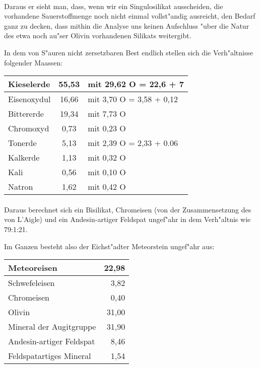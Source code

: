 \documentclass[a4paper, 11pt, oneside]{article}
\begin{document}
\paragraph{}
Daraus er sieht man, dass, wenn wir ein Singulosilikat ausscheiden, die vorhandene Sauerstoffmenge noch nicht einmal vollst"andig ausreicht, den Bedarf ganz zu decken, dass mithin die Analyse uns keinen Aufschluss "uber die Natur des etwa noch au"ser Olivin vorhandenen Silikats weitergibt.

In dem von S"auren nicht zersetzbaren Best endlich stellen sich die Verh"altnisse folgender Maassen:
\begin{center}
\begin{tabular}{ |l|c|l| }
    \hline
    Kieselerde & 55,53 & mit 29,62 O = 22,6 + 7\\\hline
    Eisenoxydul & 16,66 & mit 3,70 O = 3,58 + 0,12\\\hline
    Bittererde & 19,34 & mit 7,73 O\\\hline
    Chromoxyd & 0,73 & mit 0,23 O\\\hline
    Tonerde & 5,13 & mit 2,39 O = 2,33 + 0.06\\\hline
    Kalkerde & 1,13 & mit 0,32 O\\\hline
    Kali & 0,56 & mit 0,10 O\\\hline
    Natron & 1,62 & mit 0,42 O\\
    \hline
\end{tabular}
\end{center}
\paragraph{}
Daraus berechnet sich ein Bisilikat, Chromeisen (von der Zusammensetzung des von L'Aigle) und ein Andesin-artiger Feldspat ungef"ahr in dem Verh"altnis wie 79:1:21.

Im Ganzen besteht also der Eichst"adter Meteorstein ungef"ahr aus:
\begin{center}
    \begin{tabular}{ |l|r| } 
    \hline
    Meteoreisen & 22,98\\\hline
    Schwefeleisen & 3,82\\\hline
    Chromeisen & 0,40\\\hline
    Olivin & 31,00\\\hline
    Mineral der Augitgruppe & 31,90\\\hline
    Andesin-artiger Feldspat & 8,46\\\hline
    Feldspatartiges Mineral & 1,54\\
    \hline
    \end{tabular}
\end{center}
\end{document}
